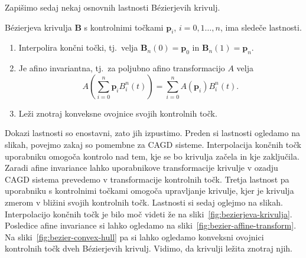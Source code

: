 \documentclass[isrm2, tisk]{fmfdelo}
\newcommand{\p}{\mathbf{p}}
\newcommand{\lilb}[2]{B_{#1}^{#2}(t)}
\newcommand{\bigbbod}[2]{\textbf{B}_{#1}(#2)}
\newcommand{\bernsteinsump}[2]{\sum_{#1=0}^{#2} \p_{#1}\lilb{#1}{#2}}
\newcommand{\bernsteinsumtritri}[3]{\sum_{#1=0}^{#2} #3\lilb{#1}{#2}}
\begin{document}
    Zapišimo sedaj nekaj osnovnih lastnosti Bézierjevih krivulj.
    \begin{izrek}{Bézierjeva krivulja $\mathbf{B}$ s kontrolnimi točkami $\p_i$, $i=0,1\ldots,n$, ima sledeče lastnosti.}
        \label{izrek:lastnosti-bezierjevih-krivulj}
        \begin{enumerate}
            \item Interpolira končni točki, tj.\ velja $\bigbbod{n}{0}=\p_0$ in $\bigbbod{n}{1}=\p_n$.
            \item Je afino invariantna, tj.\ za poljubno afino transformacijo $A$ velja \[A \left(\bernsteinsump{i}{n}\right) =\bernsteinsumtritri{i}{n}{A(\p_i)}.\]
            \item Leži znotraj konveksne ovojnice svojih kontrolnih točk.
        \end{enumerate}
    \end{izrek}
    \noindent Dokazi lastnosti so enostavni, zato jih izpustimo.
    Preden si lastnosti ogledamo na slikah, povejmo zakaj so pomembne za CAGD sisteme.
    Interpolacija končnih točk uporabniku omogoča kontrolo nad tem, kje se bo krivulja začela in kje zaključila.
    Zaradi afine invariance lahko uporabnikove transformacije krivulje v ozadju CAGD sistema prevedemo v transformacije kontrolnih točk.
    Tretja lastnost pa uporabniku s kontrolnimi točkami omogoča upravljanje krivulje, kjer je krivulja zmerom v bližini svojih kontrolnih točk.
    Lastnosti si sedaj oglejmo na slikah.
    Interpolacijo končnih točk je bilo moč videti že na sliki~\ref{fig:bezierjeva-krivulja}.
    Posledice afine invariance si lahko ogledamo na sliki~\ref{fig:bezier-affine-transform}.
    Na sliki~\ref{fig:bezier-convex-hull} pa si lahko ogledamo konveksni ovojnici kontrolnih točk dveh Bézierjevih krivulj.
    Vidimo, da krivulji ležita znotraj njih.
\end{document}
